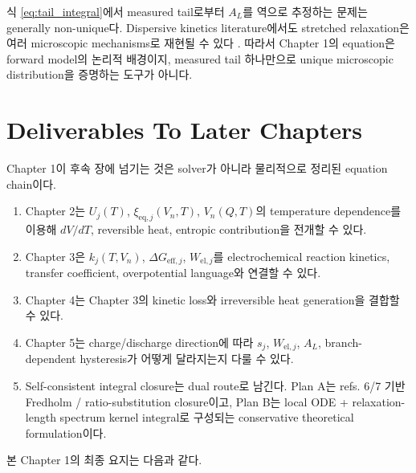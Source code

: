 \documentclass[11pt]{article}
\newcommand{\eq}{\mathrm{eq}}
\newcommand{\eff}{\mathrm{eff}}
\begin{document}
식 \eqref{eq:tail_integral}에서 measured tail로부터 \(A_L\)를 역으로 추정하는 문제는 generally
non-unique다. Dispersive kinetics literature에서도 stretched relaxation은 여러 microscopic
mechanisms로 재현될 수 있다 \cite{plonka2001}. 따라서 Chapter 1의 equation은 forward model의
논리적 배경이지, measured tail 하나만으로 unique microscopic distribution을 증명하는 도구가 아니다.

\section{Deliverables To Later Chapters}\label{sec:deliverables}

Chapter 1이 후속 장에 넘기는 것은 solver가 아니라 물리적으로 정리된 equation chain이다.

\begin{enumerate}[label=\textbf{D\arabic*.}]
\item Chapter 2는 \(U_j(T)\), \(\xi_{\eq,j}(V_n,T)\), \(V_n(Q,T)\)의 temperature dependence를 이용해 \(dV/dT\), reversible heat, entropic contribution을 전개할 수 있다.
\item Chapter 3은 \(k_j(T,V_n)\), \(\Delta G_{\eff,j}\), \(W_{\mathrm{el},j}\)를 electrochemical reaction kinetics, transfer coefficient, overpotential language와 연결할 수 있다.
\item Chapter 4는 Chapter 3의 kinetic loss와 irreversible heat generation을 결합할 수 있다.
\item Chapter 5는 charge/discharge direction에 따라 \(s_j\), \(W_{\mathrm{el},j}\), \(A_L\), branch-dependent hysteresis가 어떻게 달라지는지 다룰 수 있다.
\item Self-consistent integral closure는 dual route로 남긴다. Plan A는 refs. 6/7 기반 Fredholm /
ratio-substitution closure이고, Plan B는 local ODE + relaxation-length spectrum kernel integral로
구성되는 conservative theoretical formulation이다.
\end{enumerate}

본 Chapter 1의 최종 요지는 다음과 같다.

\begin{center}
\end{center}
\end{document}
